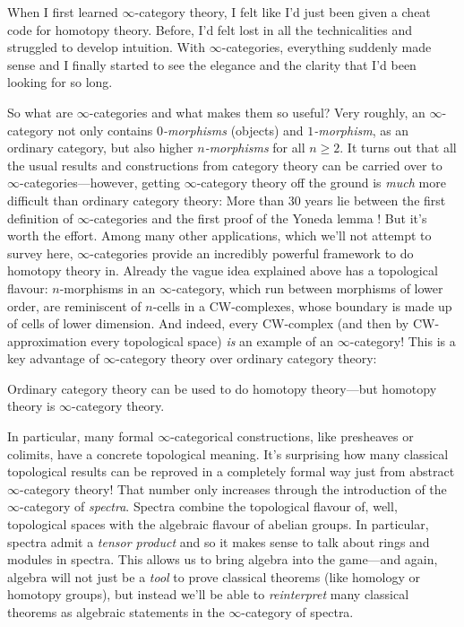 \documentclass[DIV=12,numbers=enddot,leqno,bibliography=totoc]{scrartcl}
\begin{document}
	\begin{numpar}
		When I first learned $\infty$-category theory, I felt like I'd just been given a cheat code for homotopy theory. Before, I'd felt lost in all the technicalities and struggled to develop intuition. With $\infty$-categories, everything suddenly made sense and I finally started to see the elegance and the clarity that I'd been looking for so long.
		
		So what are $\infty$-categories and what makes them so useful? Very roughly, an $\infty$-category not only contains \emph{$0$-morphisms} (objects) and \emph{$1$-morphism}, as an ordinary category, but also higher \emph{$n$-morphisms} for all $n\geqslant 2$. It turns out that all the usual results and constructions from category theory can be carried over to $\infty$-categories---however, getting $\infty$-category theory off the ground is \emph{much} more difficult than ordinary category theory: More than 30 years lie between the first definition of $\infty$-categories \cite{BoardmanVogt} and the first proof of the Yoneda lemma \cite{HTT}! But it's worth the effort. Among many other applications, which we'll not attempt to survey here, $\infty$-categories provide an incredibly powerful framework to do homotopy theory in. Already the vague idea explained above has a topological flavour: $n$-morphisms in an $\infty$-category, which run between morphisms of lower order, are reminiscent of $n$-cells in a CW-complexes, whose boundary is made up of cells of lower dimension. And indeed, every CW-complex (and then by CW-approximation every topological space) \emph{is} an example of an $\infty$-category! This is a key advantage of $\infty$-category theory over ordinary category theory:
		\begin{alphanumerate}[label={}]\itshape
			\item Ordinary category theory can be used to do homotopy theory---but homotopy theory is \embrace{!} $\infty\text{-}$category theory.
		\end{alphanumerate}
		In particular, many formal $\infty$-categorical constructions, like presheaves or colimits, have a concrete topological meaning. It's surprising how many classical topological results can be reproved in a completely formal way just from abstract $\infty$-category theory! That number only increases through the introduction of the $\infty$-category of \emph{spectra}. Spectra combine the topological flavour of, well, topological spaces with the algebraic flavour of abelian groups. In particular, spectra admit a \emph{tensor product} and so it makes sense to talk about rings and modules in spectra. This allows us to bring algebra into the game---and again, algebra will not just be a \emph{tool} to prove classical theorems (like homology or homotopy groups), but instead we'll be able to \emph{reinterpret} many classical theorems as algebraic statements in the $\infty$-category of spectra.
		

\end{numpar}
\end{document}
